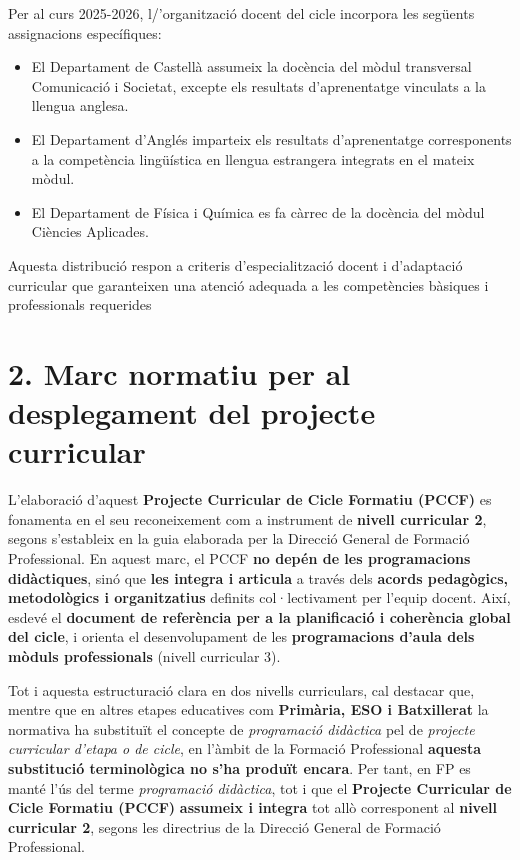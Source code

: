\documentclass[
  paper=a4,
  ,captions=tableheading
]{scrartcl}
\providecommand{\tightlist}{%
  \setlength{\itemsep}{0pt}\setlength{\parskip}{0pt}}
\begin{document}
Per al curs 2025-2026, l/'organització docent del cicle incorpora les
següents assignacions específiques:

\begin{itemize}
\tightlist
\item
  El Departament de Castellà assumeix la docència del mòdul transversal
  Comunicació i Societat, excepte els resultats d'aprenentatge vinculats
  a la llengua anglesa.
\item
  El Departament d'Anglés imparteix els resultats d'aprenentatge
  corresponents a la competència lingüística en llengua estrangera
  integrats en el mateix mòdul.
\item
  El Departament de Física i Química es fa càrrec de la docència del
  mòdul Ciències Aplicades.
\end{itemize}

Aquesta distribució respon a criteris d'especialització docent i
d'adaptació curricular que garanteixen una atenció adequada a les
competències bàsiques i professionals requerides

\hypertarget{marc-normatiu-per-al-desplegament-del-projecte-curricular}{%
\section{2. Marc normatiu per al desplegament del projecte
curricular}\label{marc-normatiu-per-al-desplegament-del-projecte-curricular}}

L'elaboració d'aquest \textbf{Projecte Curricular de Cicle Formatiu
(PCCF)} es fonamenta en el seu reconeixement com a instrument de
\textbf{nivell curricular 2}, segons s'estableix en la guia elaborada
per la Direcció General de Formació Professional. En aquest marc, el
PCCF \textbf{no depén de les programacions didàctiques}, sinó que
\textbf{les integra i articula} a través dels \textbf{acords pedagògics,
metodològics i organitzatius} definits col·lectivament per l'equip
docent. Així, esdevé el \textbf{document de referència per a la
planificació i coherència global del cicle}, i orienta el
desenvolupament de les \textbf{programacions d'aula dels mòduls
professionals} (nivell curricular 3).

Tot i aquesta estructuració clara en dos nivells curriculars, cal
destacar que, mentre que en altres etapes educatives com
\textbf{Primària, ESO i Batxillerat} la normativa ha substituït el
concepte de \emph{programació didàctica} pel de \emph{projecte
curricular d'etapa o de cicle}, en l'àmbit de la Formació Professional
\textbf{aquesta substitució terminològica no s'ha produït encara}. Per
tant, en FP es manté l'ús del terme \emph{programació didàctica}, tot i
que el \textbf{Projecte Curricular de Cicle Formatiu (PCCF)}
\textbf{assumeix i integra} tot allò corresponent al \textbf{nivell
curricular 2}, segons les directrius de la Direcció General de Formació
Professional.
\end{document}
